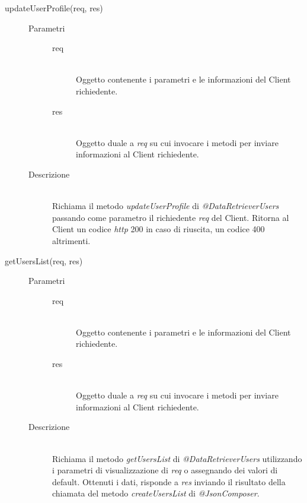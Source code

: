 \begin{description}
\begin{description}
    \item[updateUserProfile(req, res)] \hfill
      \begin{description}
	\item[Parametri] \hfill
	  \begin{description}
	    \item[req] \hfill \\
	    Oggetto contenente i parametri e le informazioni del Client richiedente.
	    \item[res] \hfill \\
	    Oggetto duale a \textit{req} su cui invocare i metodi per inviare informazioni al Client richiedente.
	  \end{description}
	\item[Descrizione] \hfill \\
	Richiama il metodo \textit{updateUserProfile} di \textit{@DataRetrieverUsers} passando come parametro il richiedente \textit{req} del Client. Ritorna al Client un codice \textit{http} 200 in caso di riuscita, un codice 400 altrimenti.
      \end{description}
      
    \item[getUsersList(req, res)] \hfill
      \begin{description}
	\item[Parametri] \hfill
	  \begin{description}
	    \item[req] \hfill \\
	    Oggetto contenente i parametri e le informazioni del Client richiedente.
	    \item[res] \hfill \\
	    Oggetto duale a \textit{req} su cui invocare i metodi per inviare informazioni al Client richiedente.
	  \end{description}
	\item[Descrizione] \hfill \\
	Richiama il metodo \textit{getUsersList} di \textit{@DataRetrieverUsers} utilizzando i parametri di visualizzazione di \textit{req} o assegnando dei valori di default. Ottenuti i dati, risponde a \textit{res} inviando il risultato della chiamata del metodo \textit{createUsersList} di \textit{@JsonComposer}.
      \end{description}
      

\end{description}
\end{description}
